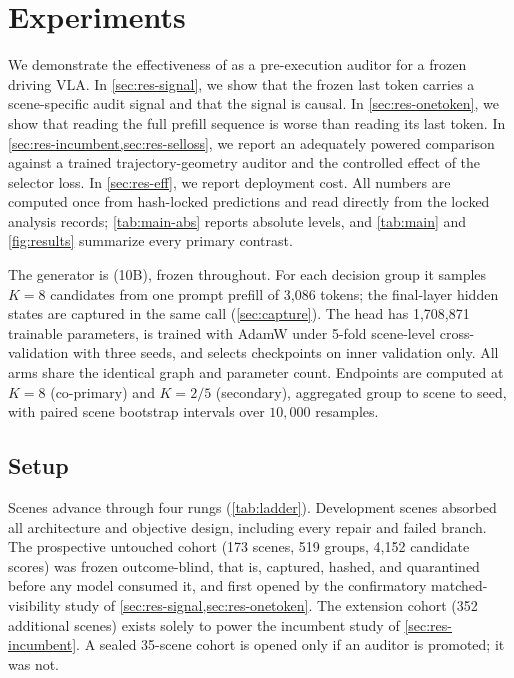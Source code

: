 \section{Experiments}
\label{sec:exp}

We demonstrate the effectiveness of \headname{} as a pre-execution auditor for a frozen driving VLA.
In \cref{sec:res-signal}, we show that the frozen last token carries a scene-specific audit signal and that the signal is causal.
In \cref{sec:res-onetoken}, we show that reading the full prefill sequence is worse than reading its last token.
In \cref{sec:res-incumbent,sec:res-selloss}, we report an adequately powered comparison against a trained trajectory-geometry auditor and the controlled effect of the selector loss.
In \cref{sec:res-eff}, we report deployment cost.
All numbers are computed once from hash-locked predictions and read directly from the locked analysis records; \cref{tab:main-abs} reports absolute levels, and \cref{tab:main} and \cref{fig:results} summarize every primary contrast.

The generator is \vlaname{} (10B), frozen throughout.
For each decision group it samples $K{=}8$ candidates from one prompt prefill of 3{,}086 tokens; the final-layer hidden states are captured in the same call (\cref{sec:capture}).
The \headname{} head has 1{,}708{,}871 trainable parameters, is trained with AdamW under 5-fold scene-level cross-validation with three seeds, and selects checkpoints on inner validation only.
All arms share the identical graph and parameter count.
Endpoints are computed at $K{=}8$ (co-primary) and $K{=}2/5$ (secondary), aggregated group to scene to seed, with paired scene bootstrap intervals over $10{,}000$ resamples.

\subsection{Setup}
\label{sec:setup}

Scenes advance through four rungs (\cref{tab:ladder}).
Development scenes absorbed all architecture and objective design, including every repair and failed branch.
The prospective untouched cohort (173 scenes, 519 groups, 4{,}152 candidate scores) was frozen outcome-blind, that is, captured, hashed, and quarantined before any model consumed it, and first opened by the confirmatory matched-visibility study of \cref{sec:res-signal,sec:res-onetoken}.
The extension cohort (352 additional scenes) exists solely to power the incumbent study of \cref{sec:res-incumbent}.
A sealed 35-scene cohort is opened only if an auditor is promoted; it was not.

